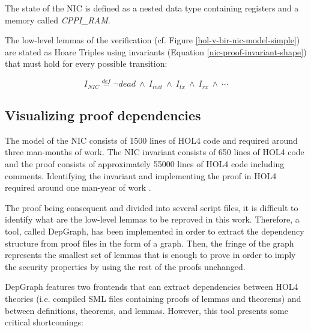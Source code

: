 \documentclass[10pt,a4paper]{article}
\newcommand{\eqdef}{\stackrel{def}{=}}
\begin{document}
\begin{multicols}{2}
The state of the NIC is defined as a nested data type containing registers and a memory called \textit{CPPI\_RAM}.

The low-level lemmas of the verification (cf. Figure \ref{hol-v-bir-nic-model-simple}) are stated as Hoare Triples using invariants (Equation \ref{nic-proof-invariant-shape}) that must hold for every possible transition:
%
\begin{small}
  \begin{equation}
    \label{nic-proof-invariant-shape}
    I_{NIC} \eqdef \neg dead~\land~I_{init}~\land~I_{tx}~\land~I_{rx}~\land~\cdots
  \end{equation}
\end{small}
\vspace{-8pt}

\subsection{Visualizing proof dependencies}

The model of the NIC consists of \num{1500} lines of HOL4 code and required around three man-months of work. The NIC invariant consists of \num{650} lines of HOL4 code and the proof consists of approximately \num{55000} lines of HOL4 code including comments. Identifying the invariant and implementing the proof in HOL4 required around one man-year of work \cite{haglund_trustworthy_nodate}.

The proof being consequent and divided into several script files, it is difficult to identify what are the low-level lemmas to be reproved in this work. Therefore, a tool, called DepGraph, has been implemented in order to extract the dependency structure from proof files in the form of a graph. Then, the fringe of the graph represents the smallest set of lemmas that is enough to prove in order to imply the security properties by using the rest of the proofs unchanged.

DepGraph features two frontends that can extract dependencies between HOL4 theories (i.e. compiled {SML} files containing proofs of lemmas and theorems) and between definitions, theorems, and lemmas. However, this tool presents some critical shortcomings:


\end{multicols}
\end{document}
